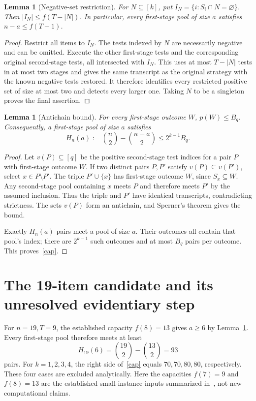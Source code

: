 \documentclass[11pt]{article}
\newtheorem{lemma}[theorem]{Lemma}
\begin{document}
\begin{lemma}[Negative-set restriction]\label{neg}
For $N\subseteq[k]$, put $I_N=\{i:S_i\cap N=\varnothing\}$. Then $|I_N|\le f(T-|N|)$. In particular, every first-stage pool of size $a$ satisfies $n-a\le f(T-1)$.
\end{lemma}
\begin{proof}
Restrict all items to $I_N$. The tests indexed by $N$ are necessarily negative and can be omitted. Execute the other first-stage tests and the corresponding original second-stage tests, all intersected with $I_N$. This uses at most $T-|N|$ tests in at most two stages and gives the same transcript as the original strategy with the known negative tests restored. It therefore identifies every restricted positive set of size at most two and detects every larger one. Taking $N$ to be a singleton proves the final assertion.
\end{proof}

\begin{lemma}[Antichain bound]\label{sperner}
For every first-stage outcome $W$, $p(W)\le B_q$. Consequently, a first-stage pool of size $a$ satisfies
\begin{equation}\label{cap}
H_n(a):=\binom n2-\binom{n-a}2\le2^{k-1}B_q.
\end{equation}
\end{lemma}
\begin{proof}
Let $v(P)\subseteq[q]$ be the positive second-stage test indices for a pair $P$ with first-stage outcome $W$. If two distinct pairs $P,P'$ satisfy $v(P)\subseteq v(P')$, select $x\in P\setminus P'$. The triple $P'\cup\{x\}$ has first-stage outcome $W$, since $S_x\subseteq W$. Any second-stage pool containing $x$ meets $P$ and therefore meets $P'$ by the assumed inclusion. Thus the triple and $P'$ have identical transcripts, contradicting strictness. The sets $v(P)$ form an antichain, and Sperner's theorem gives the bound.

Exactly $H_n(a)$ pairs meet a pool of size $a$. Their outcomes all contain that pool's index; there are $2^{k-1}$ such outcomes and at most $B_q$ pairs per outcome. This proves~\eqref{cap}.
\end{proof}

\section{The 19-item candidate and its unresolved evidentiary step}
For $n=19,T=9$, the established capacity $f(8)=13$ gives $a\ge6$ by Lemma~\ref{neg}. Every first-stage pool therefore meets at least
\[
H_{19}(6)=\binom{19}2-\binom{13}2=93
\]
pairs. For $k=1,2,3,4$, the right side of~\eqref{cap} equals $70,70,80,80$, respectively. These four cases are excluded analytically. Here the capacities $f(7)=9$ and $f(8)=13$ are the established small-instance inputs summarized in~\cite{DSW,G}, not new computational claims.
\end{document}
